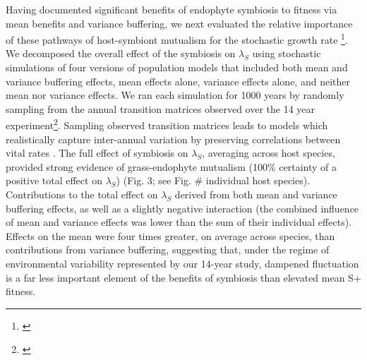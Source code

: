 \documentclass[12pt]{article}
\newcommand{\tom}[2]{{\color{red}{#1}}\footnote{\textit{\color{red}{#2}}}}
\begin{document}
Having documented significant benefits of endophyte symbiosis to fitness via mean benefits and variance buffering, we next evaluated the relative importance of these pathways of host-symbiont mutualism for the stochastic growth rate \tom{$\lambda_{S}$}{Sometimes you capitalize S and sometimes it is lowercase.}.
We decomposed the overall effect of the symbiosis on $\lambda_{S}$ using stochastic simulations of four versions of population models that included both mean and variance buffering effects, mean effects alone, variance effects alone, and neither mean nor variance effects. 
We ran each simulation for 1000 years by randomly sampling from the annual transition matrices observed over the 14 year experiment\tom{, discarding the first 100 years to remove transient dynamics}{Save for SM? Also, this does not ``remove'' transient dynamics.}. 
Sampling observed transition matrices leads to models which realistically capture inter-annual variation by preserving correlations between vital rates \cite{metcalf2015statistical}.
The full effect of symbiosis on $\lambda_{S}$, averaging across host species, provided strong evidence of grass-endophyte mutualism (100\% certainty of a positive total effect on $\lambda_{S}$) (Fig. 3; see Fig. \# individual host species).
Contributions to the total effect on $\lambda_{S}$ derived from both mean and variance buffering effects, as well as a slightly negative interaction (the combined influence of mean and variance effects was lower than the sum of their individual effects). 
Effects on the mean were four times greater, on average across species, than contributions from variance buffering, suggesting that, under the regime of environmental variability represented by our 14-year study, dampened fluctuation is a far less important element of the benefits of symbiosis than elevated mean S+ fitness. 
\end{document}
